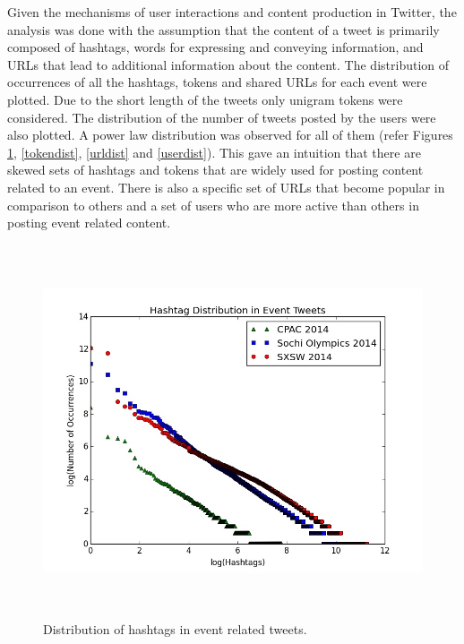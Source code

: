 Given the mechanisms of user interactions and content production in Twitter, the analysis was done with the assumption that the content of a tweet is primarily composed of hashtags, words for expressing and conveying information, and URLs that lead to additional information about the content. The distribution of occurrences of all the hashtags, tokens and shared URLs for each event were plotted. Due to the short length of the tweets only unigram tokens were considered. The distribution of the number of tweets posted by the users were also plotted.
A power law distribution was observed for all of them (refer Figures \ref{hashtagdist}, \ref{tokendist}, \ref{urldist} and \ref{userdist}). This gave an intuition that there are skewed sets of hashtags and tokens that are widely used for posting content related to an event. 
There is also a specific set of URLs that become popular in comparison to others and a set of users who are more active than others in posting event related content. 

\begin{figure}[htbp]
  \caption{Distribution of hashtags in event related tweets.}
	\label{hashtagdist}
  \centering
    \includegraphics[width=14cm,height=11cm]{Figures/HashTagDistribution.jpeg}
\end{figure}

